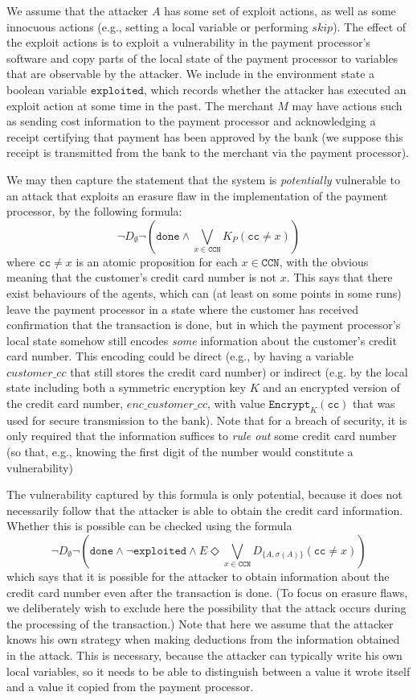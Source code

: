 \documentclass[a4wide]{article}
\theoremstyle{examplesty}
\newcommand{\strat}{\sigma}
\newcommand{\skipp}{\mathit{skip}}
\newcommand{\exploited}{\mathtt{exploited}}
\newcommand{\cc}{\mathtt{cc}}
\newcommand{\CCN}{\mathtt{CCN}}
\newcommand{\done}{\mathtt{done}}
\begin{document}
We assume that the attacker $A$ has some set of exploit actions, as well as some 
innocuous actions (e.g., setting a local variable or performing $\skipp$). 
The effect of the exploit actions is to exploit a vulnerability in the payment processor's software and
copy parts of the local state of the payment processor to variables that are observable by the 
attacker. We include in the environment state a boolean variable $\exploited$, 
which records whether the attacker has executed an exploit action at some time in the past. 
The merchant $M$ may have actions such as sending cost information to the 
payment processor and acknowledging a receipt certifying that payment has been 
approved by the  bank (we suppose this receipt  is transmitted from the 
bank to the merchant via the payment processor). 

We may then capture the statement that the system is {\em potentially} vulnerable to an 
attack that exploits an erasure flaw in the implementation of the 
payment processor, by the following formula: 
\[ 
\neg D_\emptyset \neg  (  \done \land  \bigvee_{x\in \CCN}  K_{P} (  \cc \neq  x)) 
\] 
where $ \cc \neq  x$ is an atomic proposition for each $x\in\CCN$, with the obvious meaning
that the customer's credit card number is not $x$. 
This says that there exist behaviours of the agents, which can 
(at least on some points in some runs) leave the payment processor in a state 
where the customer has received confirmation that the transaction is done, but 
in which the payment processor's local state somehow still encodes {\em some} information  about the 
customer's credit card number. This encoding could be direct (e.g., 
by having a variable $\mathit{customer\_cc}$ that still stores the credit 
card number) or indirect (e.g. by the local state including both a 
symmetric encryption key $K$ and an encrypted version of the credit card
number, $\mathit{enc\_customer\_cc}$, with value $\mathtt{Encrypt}_K(\cc)$
that was used for secure transmission to the bank). 
Note that for a breach of security, it 
is only required that 
the information suffices to {\em rule out } some credit card number 
(so that,  e.g.,  knowing the 
first digit of the number would constitute a vulnerability) 

The vulnerability captured by this formula is only potential, because
it does not necessarily follow that the attacker is able to obtain the credit 
card information. Whether this is possible can be checked 
using the formula 
\[ 
\neg D_\emptyset \neg  (  \done \land  \neg \exploited \land 
E\Diamond
\bigvee_{x\in \CCN}  D_{\{ A, \strat(A)\}} (  \cc \neq x)) 
\] 
which says that it is possible for the attacker to obtain information about the credit card number 
even after the transaction is done. (To focus on erasure flaws, we deliberately wish to exclude here
the possibility that the attack occurs during the processing of the transaction.) 
Note that here we assume that the attacker knows 
his
own strategy when making deductions from the 
information obtained in the attack. This is necessary, because the attacker can typically write 
his
own local variables, so it needs to be able to distinguish between a value it wrote itself and
a value it copied from the payment processor. 
\end{document}
